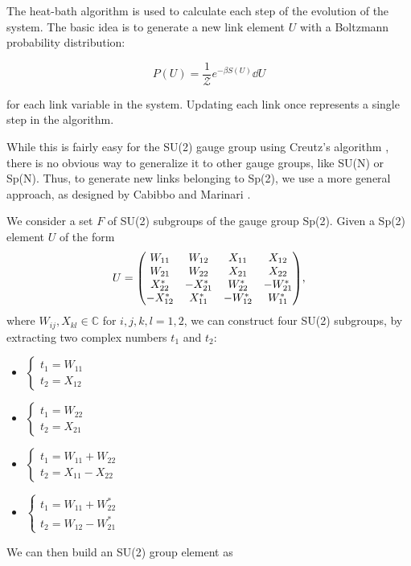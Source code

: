 \documentclass[reqno,12pt]{article}
\numberwithin{equation}{section}
\begin{document}
The heat-bath algorithm is used to calculate each step of the evolution of the system.
The basic idea is to generate a new link element $U$ with a Boltzmann probability distribution:

\begin{equation}
	P(U) = \frac{1}{\mathcal{Z}} e^{-\beta S(U)} \dd{U}
\end{equation}  

for each link variable in the system. Updating each link once represents a single step in the algorithm. 

While this is fairly easy for the SU(2) gauge group using Creutz's algorithm \cite{creutz}, there is no obvious
way to generalize it to other gauge groups, like SU(N) or Sp(N). Thus, to generate new links belonging to Sp(2), we use
a more general approach, as designed by Cabibbo and Marinari \cite{cabibbo}.  

We consider a set $F$ of SU(2) subgroups of the gauge group Sp(2). Given a Sp(2) element $U$ of the form
\begin{equation}
	U = \mqty(
		W_{11} & W_{12} & X_{11} & X_{12} \\
		W_{21} & W_{22} & X_{21} & X_{22} \\
		X^*_{22} & -X^*_{21} & W^*_{22} & -W^*_{21} \\
		-X^*_{12} & X^*_{11} & -W^*_{12} & W^*_{11}
	),
\end{equation}
where $W_{ij}, X_{kl} \in \mathbb{C}$ for $i,j,k,l = 1, 2$, 
we can construct four SU(2) subgroups, by extracting two complex numbers $t_1$ and $t_2$:
\begin{itemize}
	\item $\begin{cases} t_1 = W_{11} \\ t_2 = X_{12} \end{cases}$
	\item $\begin{cases} t_1 = W_{22} \\ t_2 = X_{21} \end{cases}$
	\item $\begin{cases} t_1 = W_{11} + W_{22} \\ t_2 = X_{11} - X_{22} \end{cases}$
	\item $\begin{cases} t_1 = W_{11} + W^*_{22} \\ t_2 = W_{12} - W^*_{21} \end{cases}$
\end{itemize}
We can then build an SU(2) group element as
\end{document}
